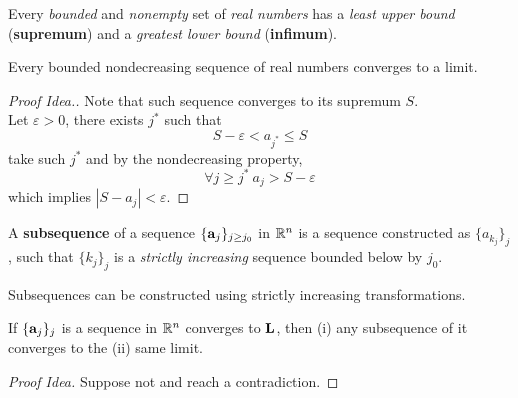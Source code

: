\documentclass[11pt]{article}
\newcommand{\vea}[0]{\ve{a}}
\begin{document}
		    \begin{axiom}
		    		Every \emph{bounded} and \emph{nonempty} set of \emph{real numbers} has a \emph{least upper bound} (\textbf{supremum}) and a \emph{greatest lower bound} (\textbf{infimum}).
		    \end{axiom}
		    
		    \begin{theorem}
		    		Every bounded nondecreasing sequence of real numbers converges to a limit.
		    		\begin{proof}[Proof Idea.]
		    			Note that such sequence converges to its supremum $S$.\\
		    			Let $\varepsilon > 0$, there exists $j^*$ such that
		    			\begin{equation}
		    				S - \varepsilon < a_{j^*} \leq S
		    			\end{equation}
		    			take such $j^*$ and by the nondecreasing property,
		    			\begin{equation}
		    				\forall j \geq j^*\ a_j > S - \varepsilon
		    			\end{equation}
		    			which implies $|S - a_j| < \varepsilon$.
		    		\end{proof}
		    \end{theorem}
		    
		    \begin{definition}
		    		A \textbf{subsequence} of a sequence $\{\vea_j\}_{j \geq j_0}$ in $\mathbb{R}^n$ is a sequence constructed as $\{a_{k_j}\}_j$, such that $\{k_j\}_j$ is a \emph{strictly increasing} sequence bounded below by $j_0$.
		    \end{definition}
		    
		    \begin{remark}
		    		Subsequences can be constructed using strictly increasing transformations.
		    \end{remark}
		    
		    \begin{proposition}
			    	If $\{\vea_j\}_j$ is a sequence in $\mathbb{R}^n$ converges to $\textbf{L}$, then (i) any subsequence of it converges to the (ii) same limit.
			    	\begin{proof}[Proof Idea]
			    		Suppose not and reach a contradiction.
			    	\end{proof}
		    \end{proposition}
		    
\end{document}

